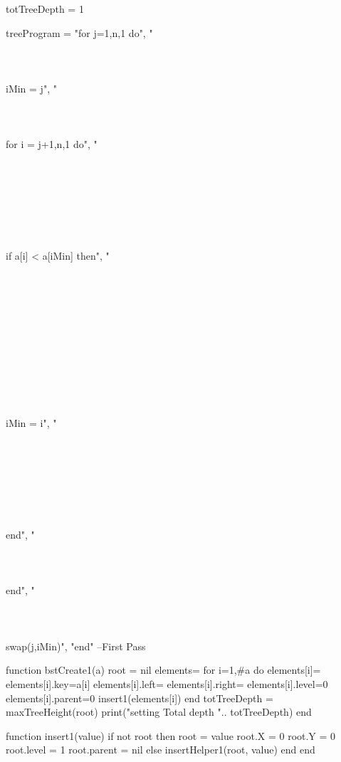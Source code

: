 
\startluacode

totTreeDepth = 1

treeProgram = {"for j=1,n,1 do",
"\\ \\ \\ \\ iMin = j",
"\\ \\ \\ \\ for i = j+1,n,1 do",
"\\ \\ \\ \\ \\ \\ \\ \\ if a[i] < a[iMin] then",
"\\ \\ \\ \\ \\ \\ \\ \\ \\ \\ \\ \\ iMin = i",
"\\ \\ \\ \\ \\ \\ \\ \\ end",
"\\ \\ \\ \\ end",
"\\ \\ \\ \\ swap(j,iMin)",
"end"
}
--First Pass

function bstCreate1(a)
	root = nil
	elements={}
	for i=1,#a do
		elements[i]={}
		elements[i].key=a[i]
		elements[i].left={}
		elements[i].right={}
		elements[i].level=0
		elements[i].parent=0
		insert1(elements[i])
	end
	totTreeDepth = maxTreeHeight(root)
	print("setting Total depth ".. totTreeDepth)
end

function insert1(value)
	if not root then
		root = value
		root.X = 0
		root.Y = 0
		root.level = 1
		root.parent = nil
	else
        	insertHelper1(root, value)
	end
end
 
